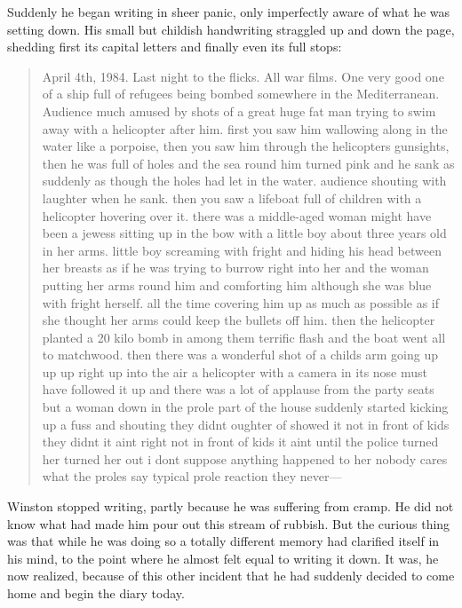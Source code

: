 Suddenly he began writing in sheer panic, only imperfectly aware of what
he was setting down. His small but childish handwriting straggled up and
down the page, shedding first its capital letters and finally even its
full stops:

\begin{quotation}
April 4th, 1984. Last night to the flicks. All war films. One very
good one of a ship full of refugees being bombed somewhere in the
Mediterranean. Audience much amused by shots of a great huge fat man
trying to swim away with a helicopter after him. first you saw him
wallowing along in the water like a porpoise, then you saw him through
the helicopters gunsights, then he was full of holes and the sea round
him turned pink and he sank as suddenly as though the holes had let in
the water. audience shouting with laughter when he sank. then you saw a
lifeboat full of children with a helicopter hovering over it. there was
a middle-aged woman might have been a jewess sitting up in the bow with
a little boy about three years old in her arms. little boy screaming
with fright and hiding his head between her breasts as if he was trying
to burrow right into her and the woman putting her arms round him and
comforting him although she was blue with fright herself. all the time
covering him up as much as possible as if she thought her arms could
keep the bullets off him. then the helicopter planted a 20 kilo bomb in
among them terrific flash and the boat went all to matchwood. then there
was a wonderful shot of a childs arm going up up up right up into the
air a helicopter with a camera in its nose must have followed it up and
there was a lot of applause from the party seats but a woman down in the
prole part of the house suddenly started kicking up a fuss and shouting
they didnt oughter of showed it not in front of kids they didnt it aint
right not in front of kids it aint until the police turned her turned
her out i dont suppose anything happened to her nobody cares what the
proles say typical prole reaction they never---
\end{quotation}

Winston stopped writing, partly because he was suffering from cramp. He
did not know what had made him pour out this stream of rubbish. But the
curious thing was that while he was doing so a totally different memory
had clarified itself in his mind, to the point where he almost felt
equal to writing it down. It was, he now realized, because of this other
incident that he had suddenly decided to come home and begin the diary
today.

